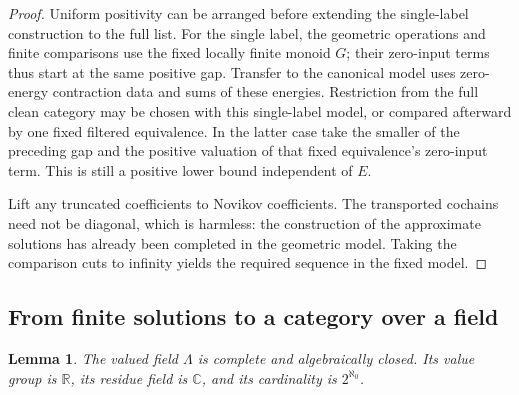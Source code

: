 \documentclass[11pt]{article}
\numberwithin{equation}{section}
\newtheorem{lemma}[theorem]{Lemma}
\theoremstyle{definition}
\theoremstyle{remark}
\newcommand{\C}{\mathbb C}
\newcommand{\R}{\mathbb R}
\begin{document}
\begin{proof}
Uniform positivity can be arranged before extending the single-label
construction to the full list.  For the single label, the geometric
operations and finite comparisons use the fixed locally finite monoid
$G$; their zero-input terms thus start at the same positive gap.
Transfer to the canonical model uses zero-energy contraction data and sums of these energies.  Restriction from the full clean
category may be chosen with this single-label model, or compared
afterward by one fixed filtered equivalence.  In the latter case
take the smaller of the preceding gap and the positive valuation
of that fixed equivalence's zero-input term.  This is still a
positive lower bound independent of $E$.

Lift any truncated coefficients to Novikov coefficients.  The
transported cochains need not be diagonal, which is harmless:
the construction of the approximate solutions has already been
completed in the geometric model.  Taking the comparison cuts to
infinity yields the required sequence in the fixed model.
\end{proof}

\subsection{From finite solutions to a category over a field}
\label{subsec:floer-field}

\begin{lemma}\label{lem:field-novikov}
The valued field $\Lambda$ is complete and algebraically closed.  Its
value group is $\R$, its residue field is $\C$, and its cardinality is
$2^{\aleph_0}$.
\end{lemma}
\end{document}
